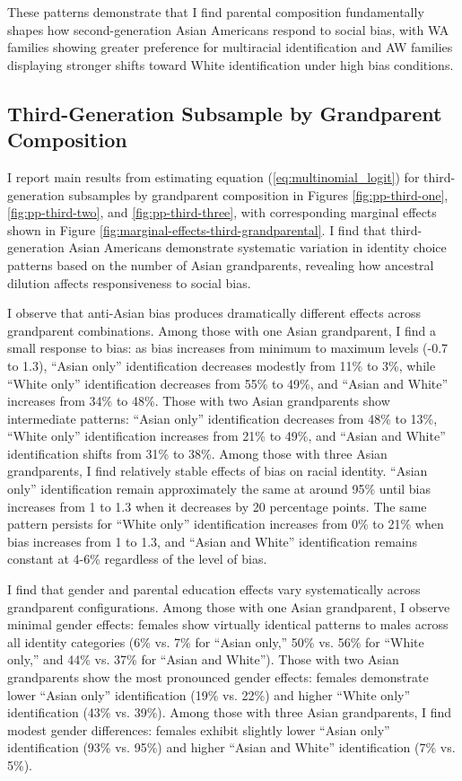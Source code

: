 These patterns demonstrate that I find parental composition fundamentally shapes how second-generation Asian Americans respond to social bias, with WA families showing greater preference for multiracial identification and AW families displaying stronger shifts toward White identification under high bias conditions.

\subsection*{Third-Generation Subsample by Grandparent Composition}
I report main results from estimating equation (\ref{eq:multinomial_logit}) for third-generation subsamples by grandparent composition in Figures \ref{fig:pp-third-one}, \ref{fig:pp-third-two}, and \ref{fig:pp-third-three}, with corresponding marginal effects shown in Figure \ref{fig:marginal-effects-third-grandparental}. I find that third-generation Asian Americans demonstrate systematic variation in identity choice patterns based on the number of Asian grandparents, revealing how ancestral dilution affects responsiveness to social bias.

I observe that anti-Asian bias produces dramatically different effects across grandparent combinations. Among those with one Asian grandparent, I find a small response to bias: as bias increases from minimum to maximum levels (-0.7 to 1.3), ``Asian only'' identification decreases modestly from 11\% to 3\%, while ``White only'' identification decreases from 55\% to 49\%, and ``Asian and White'' increases from 34\% to 48\%. Those with two Asian grandparents show intermediate patterns: ``Asian only'' identification decreases from 48\% to 13\%, ``White only'' identification increases from 21\% to 49\%, and ``Asian and White'' identification shifts from 31\% to 38\%. Among those with three Asian grandparents, I find relatively stable effects of bias on racial identity. ``Asian only'' identification remain approximately the same at around 95\% until bias increases from 1 to 1.3 when it decreases by 20 percentage points. The same pattern persists for ``White only'' identification increases from 0\% to 21\% when bias increases from 1 to 1.3, and ``Asian and White'' identification remains constant at 4-6\% regardless of the level of bias.

I find that gender and parental education effects vary systematically across grandparent configurations. Among those with one Asian grandparent, I observe minimal gender effects: females show virtually identical patterns to males across all identity categories (6\% vs. 7\% for ``Asian only,'' 50\% vs. 56\% for ``White only,'' and 44\% vs. 37\% for ``Asian and White''). Those with two Asian grandparents show the most pronounced gender effects: females demonstrate lower ``Asian only'' identification (19\% vs. 22\%) and higher ``White only'' identification (43\% vs. 39\%). Among those with three Asian grandparents, I find modest gender differences: females exhibit slightly lower ``Asian only'' identification (93\% vs. 95\%) and higher ``Asian and White'' identification (7\% vs. 5\%). 

